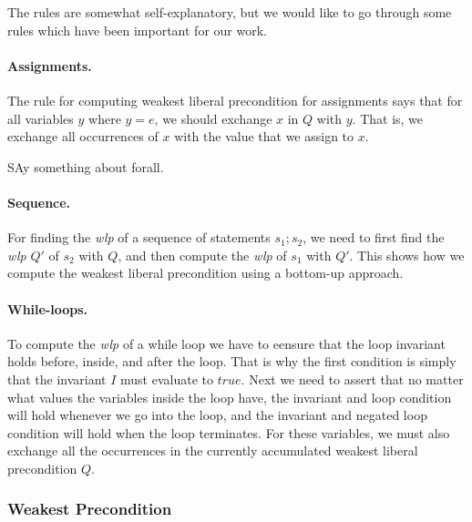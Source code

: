 The rules are somewhat self-explanatory, but we would like to go through some rules which have been important for our work.

\paragraph{Assignments.}
The rule for computing weakest liberal precondition for assignments says that for all variables $y$ where $y = e$, we should exchange $x$ in $Q$ with $y$. That is, we exchange all occurrences of $x$ with the value that we assign to $x$.

SAy something about forall.

\paragraph{Sequence.}
For finding the \textit{wlp} of a sequence of statements $s_1;s_2$, we need to first find the \textit{wlp} $Q'$ of $s_2$ with $Q$, and then compute the \textit{wlp} of $s_1$ with $Q'$. This shows how we compute the weakest liberal precondition using a bottom-up approach.

\paragraph{While-loops.}
To compute the \textit{wlp} of a while loop we have to eensure that the loop invariant holds before, inside, and after the loop. That is why the first condition is simply that the invariant $I$ must evaluate to $true$.
Next we need to assert that no matter what values the variables inside the loop have, the invariant and loop condition will hold whenever we go into the loop, and the invariant and negated loop condition will hold when the loop terminates.
For these variables, we must also exchange all the occurrences in the currently accumulated weakest liberal precondition $Q$.

\subsubsection{Weakest Precondition}

